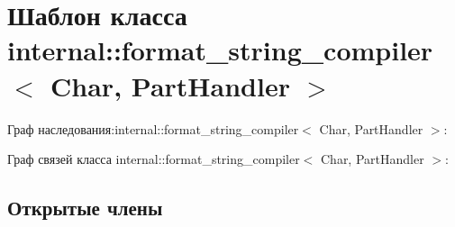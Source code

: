 \hypertarget{classinternal_1_1format__string__compiler}{}\section{Шаблон класса internal\+:\+:format\+\_\+string\+\_\+compiler$<$ Char, Part\+Handler $>$}
\label{classinternal_1_1format__string__compiler}


Граф наследования\+:internal\+:\+:format\+\_\+string\+\_\+compiler$<$ Char, Part\+Handler $>$\+:


Граф связей класса internal\+:\+:format\+\_\+string\+\_\+compiler$<$ Char, Part\+Handler $>$\+:
\subsection*{Открытые члены}
